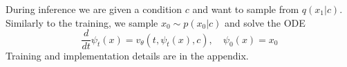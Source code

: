 During inference we are given a condition $c$ and want to sample from $q(x_1|c)$. Similarly to the training, we sample $x_0\sim p(x_0|c)$ and solve the ODE 
\begin{equation}
    \frac{d}{dt} \psi_t(x) = v_\theta \left(t, \psi_t(x), c \right), \quad \psi_0(x) = x_0
\end{equation}
Training and implementation details are in the appendix.







